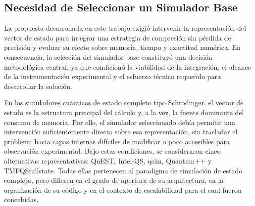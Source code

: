 \subsection{Necesidad de Seleccionar un Simulador Base}

La propuesta desarrollada en este trabajo exigió intervenir la representación del vector
de estado para integrar una estrategia de compresión sin pérdida de precisión y
evaluar su efecto sobre memoria, tiempo y exactitud numérica. En consecuencia, la
selección del simulador base constituyó una decisión metodológica central, ya que
condicionó la viabilidad de la integración, el alcance de la instrumentación
experimental y el esfuerzo técnico requerido para desarrollar la solución.

En los simuladores cuánticos de estado completo tipo Schrödinger, el vector de estado
es la estructura principal del cálculo y, a la vez, la fuente dominante del consumo de
memoria. Por ello, el simulador seleccionado debía permitir una intervención
suficientemente directa sobre esa representación, sin trasladar el problema hacia capas
internas difíciles de modificar o poco accesibles para observación experimental. Bajo
estas condiciones, se consideraron cinco alternativas representativas: QuEST,
Intel-QS, qsim, Quantum++ y TMFQSfullstate. Todas ellas pertenecen al paradigma de
simulación de estado completo, pero difieren en el grado de apertura de su
arquitectura, en la organización de su código y en el contexto de escalabilidad para el
cual fueron concebidas.